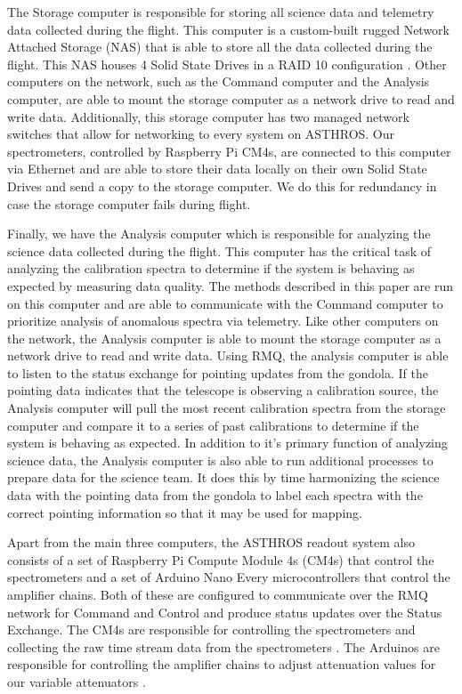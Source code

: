 The Storage computer is responsible for storing all science data and telemetry data collected during the flight.
This computer is a custom-built rugged Network Attached Storage (NAS) that is able to store all the data collected during the flight.
This NAS houses 4 Solid State Drives in a RAID 10 configuration \parencite{chen1994raid}.
Other computers on the network, such as the Command computer and the Analysis computer, are able to mount the storage computer as a network drive to read and write data.
Additionally, this storage computer has two managed network switches that allow for networking to every system on ASTHROS.
Our spectrometers, controlled by Raspberry Pi CM4s, are connected to this computer via Ethernet and are able to store their data locally on their own Solid State Drives and send a copy to the storage computer.
We do this for redundancy in case the storage computer fails during flight.

Finally, we have the Analysis computer which is responsible for analyzing the science data collected during the flight. 
This computer has the critical task of analyzing the calibration spectra to determine if the system is behaving as expected by measuring data quality. 
The methods described in this paper are run on this computer and are able to communicate with the Command computer to prioritize analysis of anomalous spectra via telemetry.
Like other computers on the network, the Analysis computer is able to mount the storage computer as a network drive to read and write data.
Using RMQ, the analysis computer is able to listen to the status exchange for pointing updates from the gondola.
If the pointing data indicates that the telescope is observing a calibration source, the Analysis computer will pull the most recent calibration spectra from the storage computer and compare it to a series of past calibrations to determine if the system is behaving as expected.
In addition to it's primary function of analyzing science data, the Analysis computer is also able to run additional processes to prepare data for the science team. 
It does this by time harmonizing the science data with the pointing data from the gondola to label each spectra with the correct pointing information so that it may be used for mapping. 

Apart from the main three computers, the ASTHROS readout system also consists of a set of Raspberry Pi Compute Module 4s (CM4s) that control the spectrometers and a set of Arduino Nano Every microcontrollers that control the amplifier chains. 
Both of these are configured to communicate over the RMQ network for Command and Control and produce status updates over the Status Exchange. 
The CM4s are responsible for controlling the spectrometers and collecting the raw time stream data from the spectrometers \parencite{mohammed2024digital}.
The Arduinos are responsible for controlling the amplifier chains to adjust attenuation values for our variable attenuators \parencite{Ricardo}.

